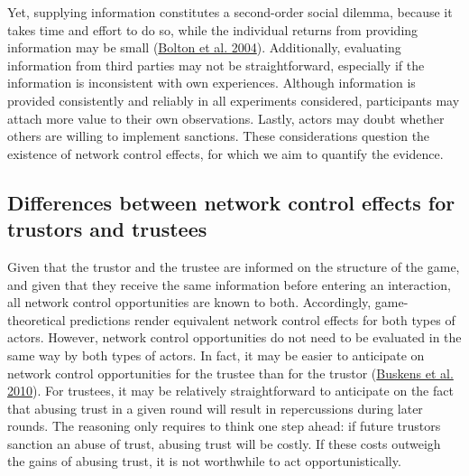 \documentclass[
  11pt,
]{article}
\begin{document}
Yet, supplying information constitutes a second-order social dilemma, because it takes time and effort to do so, while the individual returns from providing information may be small (\protect\hyperlink{ref-bolton_electronic_2004}{Bolton et al. 2004}).
Additionally, evaluating information from third parties may not be straightforward, especially if the information is inconsistent with own experiences.
Although information is provided consistently and reliably in all experiments considered, participants may attach more value to their own observations.
Lastly, actors may doubt whether others are willing to implement sanctions.
These considerations question the existence of network control effects, for which we aim to quantify the evidence.

\hypertarget{differences-between-network-control-effects-for-trustors-and-trustees}{%
\subsection{Differences between network control effects for trustors and trustees}\label{differences-between-network-control-effects-for-trustors-and-trustees}}

Given that the trustor and the trustee are informed on the structure of the game, and given that they receive the same information before entering an interaction, all network control opportunities are known to both.
Accordingly, game-theoretical predictions render equivalent network control effects for both types of actors.
However, network control opportunities do not need to be evaluated in the same way by both types of actors.
In fact, it may be easier to anticipate on network control opportunities for the trustee than for the trustor (\protect\hyperlink{ref-buskens_raub_veer_triads_2010}{Buskens et al. 2010}).
For trustees, it may be relatively straightforward to anticipate on the fact that abusing trust in a given round will result in repercussions during later rounds.
The reasoning only requires to think one step ahead: if future trustors sanction an abuse of trust, abusing trust will be costly.
If these costs outweigh the gains of abusing trust, it is not worthwhile to act opportunistically.
\end{document}
